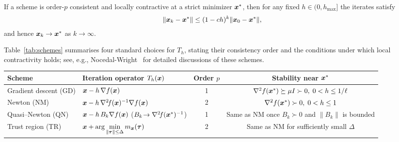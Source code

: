 \documentclass[10pt]{article}
\begin{document}
        \medskip 
            
        If a scheme is order-$p$ consistent and locally contractive at a strict
        minimizer $\bm{x}^{*}$, then for any fixed $h\in(0,h_{\max}]$
        the iterates satisfy
        $$
            \|\bm{x}_{k}-\bm{x}^{*}\|\le(1-ch)^{k}\|\bm{x}_{0}-\bm{x}^{*}\|,
        $$
        and hence $\bm{x}_{k}\to\bm{x}^{*}$ as $k\to\infty$.

        \medskip

        Table~\ref{tab:schemes} summarises four standard choices for $T_{h}$,
        stating their consistency order and the conditions under which local 
        contractivity holds; see, e.g., Nocedal-Wright~\cite{NocedalAndWright06}
        for detailed discussions of these schemes.

        \medskip
        \begin{minipage}{0.8\textwidth}
        \centering
        \renewcommand{\arraystretch}{1.2}
        \begin{tabular}{@{}l l c c@{}}
            \toprule
            \textbf{Scheme} & 
            \textbf{Iteration operator $T_{h}(\bm{x})$} & 
            \textbf{Order $p$} & 
            \textbf{Stability near $\bm{x}^{*}$} \\ \midrule
            Gradient descent (GD) &
            $\bm{x}-h\,\nabla f(\bm{x})$ &
            1 &
            $\nabla^{2}f(\bm{x}^{*})\succeq \mu I\succ0,\; 0<h\le 1/\ell$ \\[3pt]

            Newton (NM) &
            $\bm{x}-h\,\nabla^{2}\!f(\bm{x})^{-1}\nabla f(\bm{x})$ &
            2 &
            $\nabla^{2}f(\bm{x}^{*})\succ0,\; 0<h\le 1$ \\[3pt]

            Quasi–Newton (QN) &
            $\bm{x}-h\,B_{k}\nabla f(\bm{x})$ \quad
            ($B_{k}\!\to\nabla^{2}\!f(\bm{x}^{*})^{-1}$) &
            1 &
            Same as NM once $B_{k}\succ0$ and $\|B_{k}\|$ is bounded \\[3pt]

            Trust region (TR) &
            $\displaystyle
            \bm{x}+\arg\min_{\|\bm{\tau}\|\le\Delta}
            m_{\bm{x}}(\bm{\tau})$ &
            2 &
            Same as NM for sufficiently small $\Delta$ \\ \bottomrule
        \end{tabular}
        \label{tab:schemes}
        \end{minipage} 
        
\end{document}
